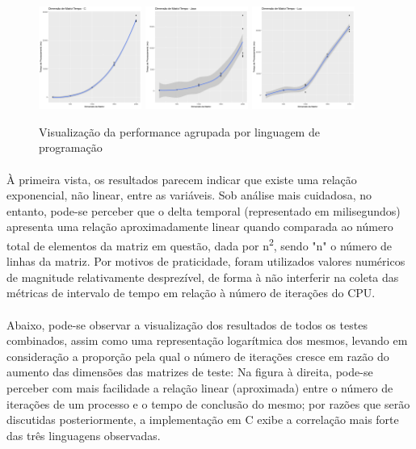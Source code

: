 \documentclass[11pt]{article}
\begin{document}
\begin{figure}[!ht]
    \centering
    \includegraphics[width =0.3\textwidth]{plot_c.png}
    \includegraphics[width =0.3\textwidth]{plot_java.png}
    \includegraphics[width =0.3\textwidth]{plot_lua.png}
    \caption{Visualização da performance agrupada por linguagem de programação}
\end{figure}

\paragraph{}
À primeira vista, os resultados parecem indicar que existe uma relação
exponencial, não linear, entre as variáveis. Sob análise mais cuidadosa, no
entanto, pode-se perceber que o delta temporal (representado em milisegundos)
apresenta uma relação aproximadamente linear quando comparada ao número
total de elementos da matriz em questão, dada por n\textsuperscript{2}, sendo
"n" o número de linhas da matriz. Por motivos de praticidade, foram utilizados
valores numéricos de magnitude relativamente desprezível\cite{rafferty2017evaluation},
de forma à não interferir na coleta das métricas de intervalo de tempo em relação à
número de iterações do CPU.

\paragraph{}
Abaixo, pode-se observar a visualização dos resultados de todos os testes
combinados, assim como uma representação logarítmica dos mesmos, levando em
consideração a proporção pela qual o número de iterações cresce em razão do
aumento das dimensões das matrizes de teste: Na figura à direita, pode-se
perceber com mais facilidade a relação linear (aproximada) entre o número de
iterações de um processo e o tempo de conclusão do mesmo;
por razões que serão discutidas posteriormente, a implementação em C exibe a
correlação mais forte das três linguagens observadas.
\end{document}
